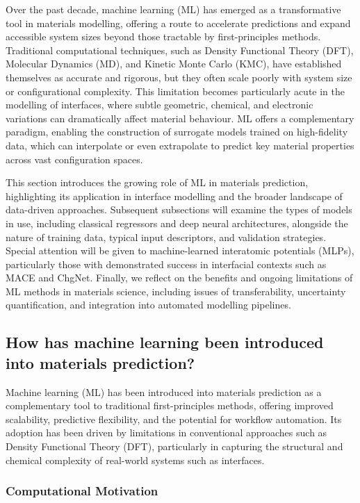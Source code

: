 Over the past decade, machine learning (ML) has emerged as a transformative tool in materials modelling, offering a route to accelerate predictions and expand accessible system sizes beyond those tractable by first-principles methods. Traditional computational techniques, such as Density Functional Theory (DFT), Molecular Dynamics (MD), and Kinetic Monte Carlo (KMC), have established themselves as accurate and rigorous, but they often scale poorly with system size or configurational complexity. This limitation becomes particularly acute in the modelling of interfaces, where subtle geometric, chemical, and electronic variations can dramatically affect material behaviour. ML offers a complementary paradigm, enabling the construction of surrogate models trained on high-fidelity data, which can interpolate or even extrapolate to predict key material properties across vast configuration spaces. 
 
This section introduces the growing role of ML in materials prediction, highlighting its application in interface modelling and the broader landscape of data-driven approaches. Subsequent subsections will examine the types of models in use, including classical regressors and deep neural architectures, alongside the nature of training data, typical input descriptors, and validation strategies. Special attention will be given to machine-learned interatomic potentials (MLPs), particularly those with demonstrated success in interfacial contexts such as MACE and ChgNet. Finally, we reflect on the benefits and ongoing limitations of ML methods in materials science, including issues of transferability, uncertainty quantification, and integration into automated modelling pipelines. 
 
\subsection{How has machine learning been introduced into materials prediction?} 
 
Machine learning (ML) has been introduced into materials prediction as a complementary tool to traditional first-principles methods, offering improved scalability, predictive flexibility, and the potential for workflow automation. Its adoption has been driven by limitations in conventional approaches such as Density Functional Theory (DFT), particularly in capturing the structural and chemical complexity of real-world systems such as interfaces. 
 
\subsubsection{Computational Motivation} 
 
